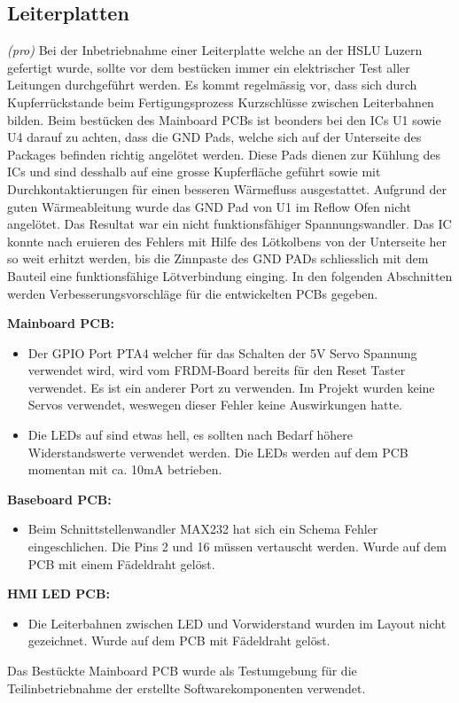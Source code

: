 \subsection{Leiterplatten}
\textit{(pro)} Bei der Inbetriebnahme einer Leiterplatte welche an der HSLU Luzern gefertigt wurde, sollte vor dem bestücken immer ein elektrischer Test aller Leitungen durchgeführt werden. Es kommt regelmässig vor, dass sich durch Kupferrückstande beim Fertigungsprozess Kurzschlüsse zwischen Leiterbahnen bilden. Beim bestücken des Mainboard PCBs ist beonders bei den ICs U1 sowie U4 darauf zu achten, dass die GND Pads, welche sich auf der Unterseite des Packages befinden richtig angelötet werden. Diese Pads dienen zur Kühlung des ICs und sind desshalb auf eine grosse Kupferfläche geführt sowie mit Durchkontaktierungen für einen besseren Wärmefluss ausgestattet. Aufgrund der guten Wärmeableitung wurde das GND Pad von U1 im Reflow Ofen nicht angelötet. Das Resultat war ein nicht funktionsfähiger Spannungswandler. Das IC konnte nach eruieren des Fehlers mit Hilfe des Lötkolbens von der Unterseite her so weit erhitzt werden, bis die Zinnpaste des GND PADs schliesslich mit dem Bauteil eine funktionsfähige Lötverbindung einging. In den folgenden Abschnitten werden Verbesserungsvorschläge für die entwickelten PCBs gegeben.
\newline

\textbf{Mainboard PCB:}
\begin{itemize}
	\item Der GPIO Port PTA4 welcher für das Schalten der 5V Servo Spannung verwendet wird, wird vom FRDM-Board bereits für den Reset Taster verwendet. Es ist ein anderer Port zu verwenden. Im Projekt wurden keine Servos verwendet, weswegen dieser Fehler keine Auswirkungen hatte.
	\item Die LEDs auf sind etwas hell, es sollten nach Bedarf höhere Widerstandswerte verwendet werden. Die LEDs werden auf dem PCB momentan mit ca. 10mA betrieben.
\end{itemize}

\textbf{Baseboard PCB:}
\begin{itemize}
	\item Beim Schnittstellenwandler MAX232 hat sich ein Schema Fehler eingeschlichen. Die Pins 2 und 16 müssen vertauscht werden. Wurde auf dem PCB mit einem Fädeldraht gelöst.
\end{itemize}

\textbf{HMI LED PCB:}
\begin{itemize}
	\item Die Leiterbahnen zwischen LED und Vorwiderstand wurden im Layout nicht gezeichnet. Wurde auf dem PCB mit Fädeldraht gelöst.
\end{itemize}

Das Bestückte Mainboard PCB wurde als Testumgebung für die Teilinbetriebnahme der erstellte Softwarekomponenten verwendet.